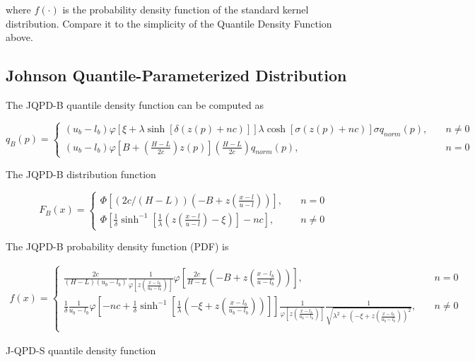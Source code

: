 \documentclass[
  letterpaper,
  DIV=11,
  numbers=noendperiod]{scrartcl}
\begin{document}
where \(f(\cdot)\) is the probability density function of the standard
kernel distribution. Compare it to the simplicity of the Quantile
Density Function above.

\subsection*{Johnson Quantile-Parameterized
Distribution}\label{johnson-quantile-parameterized-distribution}

The JQPD-B quantile density function can be computed as

\[
q_B(p)=\begin{cases}
(u_b-l_b)\varphi[\xi+\lambda\sinh[\delta(z(p)+nc)]]\lambda\cosh[\sigma(z(p)+nc)] \sigma q_{norm}(p), \quad &n\neq 0\\
(u_b-l_b)\varphi\left[B+\left(\frac{H-L}{2c}\right)z(p)\right]\left(\frac{H-L}{2c}\right)q_{norm}(p), \quad &n=0
\end{cases}
\]

The JQPD-B distribution function

\[
F_B(x)=\begin{cases}
\Phi\left[(2c/(H-L))(-B+z\left(\frac{x-l}{u-l}\right))\right], \quad &n=0 \\
\Phi\left[\frac{1}{\delta}\sinh^{-1}\left[\frac{1}{\lambda}\left(z\left(\frac{x-l}{u-l}\right)-\xi\right)\right]-nc\right], \quad &n\neq0
\end{cases}
\]

The JQPD-B probability density function (PDF) is

\[
\begin{gathered}
f(x)=\begin{cases}
\frac{2c}{(H-L)(u_b-l_b)}\frac{1}{\varphi\left[z\left(\frac{x-l_b}{u_b-l_b}\right)\right]}\varphi\left[\frac{2c}{H-L}\left(-B+z\left(\frac{x-l_b}{u-l_b}\right)\right)\right], \quad &n=0\\
\frac{1}{\delta}\frac{1}{u_b-l_b}\varphi\left[-nc+\frac{1}{\delta}\sinh^{-1}\left[\frac{1}{\lambda}\left(-\xi+z\left(\frac{x-l_b}{u_b-l_b}\right)\right)\right]\right] \frac{1}{\varphi\left[z\left(\frac{x-l_b}{u_b-l_b}\right)\right]}\frac{1}{\sqrt{\lambda^2+\left(-\xi+z\left(\frac{x-l_b}{u_b-l_b}\right)\right)^2}}, \quad &n\neq 0\\
\end{cases}
\end{gathered}
\]

J-QPD-S quantile density function
\end{document}
